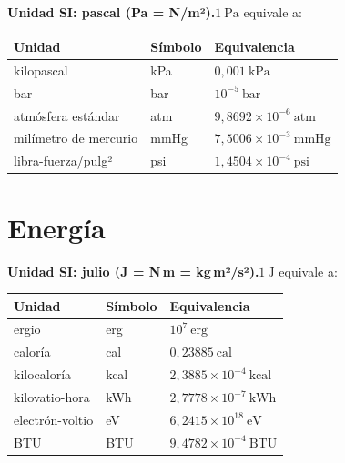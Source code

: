 \documentclass[12pt, letterpaper]{article}
\begin{document}
\begin{cuadroteoria}
    \textbf{Unidad SI: pascal (Pa = N/m²).}\quad $1\ \text{Pa}$ equivale a:
    \begin{center}
        \begin{tabular}{lll}
            \toprule
            \textbf{Unidad}       & \textbf{Símbolo} & \textbf{Equivalencia}                  \\
            \midrule
            kilopascal            & kPa              & $0{,}001\ \text{kPa}$                  \\
            bar                   & bar              & $10^{-5}\ \text{bar}$                  \\
            atmósfera estándar    & atm              & $9{,}8692 \times 10^{-6}\ \text{atm}$  \\
            milímetro de mercurio & mmHg             & $7{,}5006 \times 10^{-3}\ \text{mmHg}$ \\
            libra-fuerza/pulg²    & psi              & $1{,}4504 \times 10^{-4}\ \text{psi}$  \\
            \bottomrule
        \end{tabular}
    \end{center}
\end{cuadroteoria}

\section{Energía}

\begin{cuadroteoria}
    \textbf{Unidad SI: julio (J = N\,m = kg\,m²/s²).}\quad $1\ \text{J}$ equivale a:
    \begin{center}
        \begin{tabular}{lll}
            \toprule
            \textbf{Unidad} & \textbf{Símbolo} & \textbf{Equivalencia}                  \\
            \midrule
            ergio           & erg              & $10^{7}\ \text{erg}$                   \\
            caloría         & cal              & $0{,}23885\ \text{cal}$                \\
            kilocaloría     & kcal             & $2{,}3885 \times 10^{-4}\ \text{kcal}$ \\
            kilovatio-hora  & kWh              & $2{,}7778 \times 10^{-7}\ \text{kWh}$  \\
            electrón-voltio & eV               & $6{,}2415 \times 10^{18}\ \text{eV}$   \\
            BTU             & BTU              & $9{,}4782 \times 10^{-4}\ \text{BTU}$  \\
            \bottomrule
        \end{tabular}
    \end{center}
\end{cuadroteoria}
\end{document}
